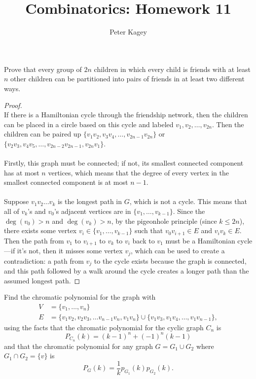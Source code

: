 \documentclass{article}
\newenvironment{problem}[2][Problem]{\begin{trivlist}
\item[\hskip \labelsep {\bfseries #1}\hskip \labelsep {\bfseries #2.}]}{\end{trivlist}}
\newcommand{\set}[1]{\{ #1 \}}
\begin{document}
\title{Combinatorics: Homework 11}
\author{Peter Kagey}

\maketitle

\begin{problem}{1}
  Prove that every group of $2n$ children in which every child is friends with
  at least $n$ other children can be partitioned into pairs of friends in at
  least two different ways.
\end{problem}

\begin{proof} $ $ \\
  If there is a Hamiltonian cycle through the friendship network, then the
  children can be placed in a circle based on this cycle and labeled
  $v_1, v_2, \hdots, v_{2n}$.
  Then the children can be paired up
  $\set{v_1v_2, v_3v_4, \hdots, v_{2n-1}v_{2n}}$ or
  $\set{v_2v_3, v_4v_5, \hdots, v_{2n-2}v_{2n-1}, v_{2n}v_1}$.
  \\~\\
  Firstly, this graph must be connected; if not, its smallest connected component has at
  most $n$ vertices, which means that the degree of every vertex in the smallest
  connected component is at most $n-1$.
  \\~\\
  Suppose $v_1v_2\hdots v_k$ is the longest path in $G$, which is not a cycle.
  This means that all of $v_k$'s and $v_0$'s adjacent vertices are in
  $\set{v_1, \hdots, v_{k-1}}$. Since the $\deg(v_0) > n$ and $\deg(v_k) > n$,
  by the pigeonhole principle (since $k \leq 2n$), there exists some vertex
  $v_i \in \set{v_1, \hdots, v_{k-1}}$ such that $v_0v_{i+1} \in E$ and
  $v_iv_k \in E$.
  Then the path from $v_1$ to $v_{i+1}$ to $v_k$ to $v_{i}$ back to $v_1$ must
  be a Hamiltonian cycle---if it's not, then it misses some vertex $v_j$, which
  can be used to create a contradiction: a path from $v_j$ to the
  cycle exists because the graph is connected, and this path followed by
  a walk around the cycle creates a longer path than the assumed longest path.
\end{proof}
\pagebreak
\begin{problem}{2}
  Find the chromatic polynomial for the graph with \begin{align*}
    V &= \set{v_1, \hdots, v_n} \\
    E &= \set{v_1 v_2, v_2v_3, \hdots v_{n-1}v_{n}, v_1v_n}
      \cup \set{v_1v_3, v_1v_4, \hdots, v_1v_{n-1}},
  \end{align*} using the facts that the chromatic polynomial for the cyclic
  graph $C_n$ is \[
    P_{C_n}(k) = (k-1)^n + (-1)^n(k-1)
  \] and that the chromatic polynomial for any graph $G = G_1 \cup G_2$ where
  $G_1 \cap G_2 = \set{v}$ is \[
    P_G(k) = \frac{1}{k}p_{G_1}(k)p_{G_2}(k).
  \]
\end{problem}
\end{document}
